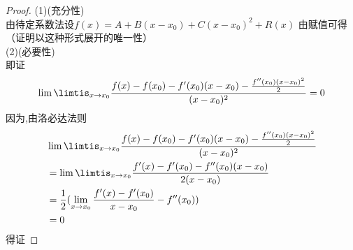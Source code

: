 \documentclass[12pt, a4paper, oneside]{ctexart}
\begin{document}
\begin{proof}
(1)\;\;(\mbox{充分性})\\
由待定系数法设$f(x)=A+B(x-x_0)+C(x-x_0)^{2}+R(x)$
由赋值可得（证明以这种形式展开的唯一性）\\%
(2)\;\;(\mbox{必要性})\\
即证
\begin{equation}
    \lim\limtis_{x \to x_0}\frac{f(x)-f(x_0)-f^{\prime}(x_0)(x-x_0)-\frac{f^{\prime \prime }(x_0)(x-x_0)^{2}}{2}}{(x-x_0)^{2}}=0
\end{equation}
因为,由洛必达法则
\begin{equation}
\begin{aligned}
   & \lim\limtis_{x \to x_0}\frac{f(x)-f(x_0)-f^{\prime}(x_0)(x-x_0)-\frac{f^{\prime \prime }(x_0)(x-x_0)^{2}}{2}}{(x-x_0)^{2}}\\
   & =\lim\limtis_{x\to x_0}\frac{f^{\prime}(x)-f^{\prime}(x_0)-f^{\prime \prime }(x_0)(x-x_0)}{2(x-x_0)}\\
   & =\frac{1}{2}(\lim\limits_{x\to x_0}\frac{f^{\prime}(x)-f^{\prime}(x_0)}{x-x_0}-f^{\prime \prime}(x_0))\\
   &=0
\end{aligned}
\end{equation}
得证
\end{proof}
\end{document}
